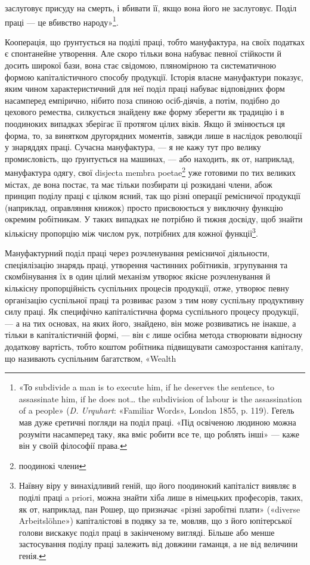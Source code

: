 \parcont{}  %
заслуговує присуду на смерть, і вбивати її, якщо вона його не
заслуговує. Поділ праці — це вбивство народу»\footnote{
«То subdivide a man is to execute him, if he deserves the sentence,
to assassinate him, if he does not\dots{} the subdivision of labour is the assassination
of a people» (\emph{D. Urquhart}: «Familiar Words», London 1855,
p. 119). Геґель мав дуже єретичні погляди на поділ праці. «Під освіченою
людиною можна розуміти насамперед таку, яка вміє робити все
те, що роблять інші» — каже він у своїй філософії права.
}.

Кооперація, що ґрунтується на поділі праці, тобто мануфактура,
на своїх податках є спонтанейне утворення. Але скоро
тільки вона набуває певної стійкости й досить широкої бази,
вона стає свідомою, пляномірною та систематичною формою капіталістичного
способу продукції. Історія власне мануфактури
показує, яким чином характеристичний для неї поділ праці
набуває відповідних форм насамперед емпірично, нібито поза
спиною осіб-діячів, а потім, подібно до цехового ремества, силкується
знайдену вже форму зберегти як традицію і в поодиноких
випадках зберігає її протягом цілих віків. Якщо й змінюється
ця форма, то, за винятком другорядних моментів, завжди лише в
наслідок революції у знаряддях праці. Сучасна мануфактура, —
я не кажу тут про велику промисловість, що ґрунтується на
машинах, — або находить, як от, наприклад, мануфактура одягу,
свої disjecta membra poetae\footnote*{
поодинокі члени

} уже готовими по тих великих містах,
де вона постає, та має тільки позбирати ці розкидані члени,
абож принцип поділу праці є цілком ясний, так що різні
операції ремісничої продукції (наприклад, оправляння книжок)
просто присвоюється у виключну функцію окремим робітникам.
У таких випадках не потрібно й тижня досвіду, щоб знайти
кількісну пропорцію між числом рук, потрібних для кожної
функції\footnote{
Наївну віру у винахідливий геній, що його поодинокий капіталіст
виявляє в поділі праці a priori, можна знайти хіба лише в німецьких
професорів, таких, як от, наприклад, пан Рошер, що призначає «різні
заробітні плати» («diverse Arbeitslöhne») капіталістові в подяку за те,
мовляв, що з його юпітерської голови вискакує поділ праці в закінченому
вигляді. Більше або менше застосування поділу праці залежить від
довжини гаманця, а не від величини генія.
}.

Мануфактурний поділ праці через розчленування ремісничої
діяльности, спеціялізацію знарядь праці, утворення частинних
робітників, згрупування та скомбінування їх в один цілий механізм
утворює якісне розчленування й кількісну пропорційність
суспільних процесів продукції, отже, утворює певну організацію
суспільної праці та розвиває разом з тим нову суспільну продуктивну
силу праці. Як специфічно капіталістична форма суспільного
процесу продукції, — а на тих основах, на яких його,
знайдено, він може розвиватись не інакше, а тільки в капіталістичній
формі, — він є лише осібна метода створювати відносну додаткову
вартість, тобто коштом робітника підвищувати самозростання
капіталу, що називають суспільним багатством, «Wealth
\parbreak{}  %
